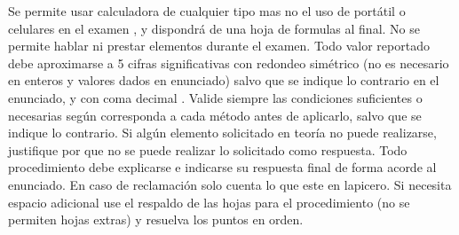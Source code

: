 \documentclass[12pt]{article}
\begin{document}
{\scriptsize  
Se permite usar calculadora de cualquier tipo mas no el uso de portátil o celulares en el examen%
, y dispondrá de una hoja de formulas al final. %
No se permite hablar ni prestar elementos durante el examen. %
Todo valor reportado debe aproximarse a 5 cifras significativas con redondeo simétrico (no es necesario en enteros y valores dados en enunciado) salvo que se indique lo contrario en el enunciado, y con coma decimal%
. 
Valide siempre las condiciones suficientes o necesarias según corresponda a cada método antes de aplicarlo, salvo que se indique lo contrario. Si algún elemento solicitado en teoría no puede realizarse, justifique por que no se puede realizar lo solicitado como respuesta. Todo procedimiento debe explicarse e indicarse su respuesta final de forma acorde al enunciado. %
En caso de reclamación solo cuenta lo que este en lapicero. %
Si necesita espacio adicional %
use el respaldo de las hojas para el procedimiento (no se permiten hojas extras) y resuelva los puntos en orden. %
}
\vspace{-.5cm}
\end{document}
